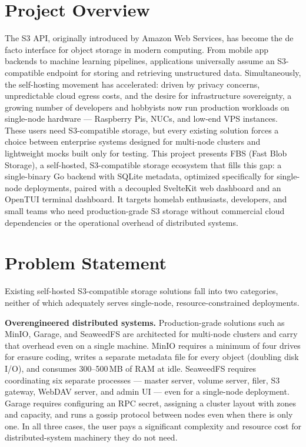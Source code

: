 \documentclass[12pt,a4paper]{report}
\begin{document}
\newpage
\thispagestyle{empty}
\tableofcontents

\newpage
{}
\setcounter{page}{1}

\section{Project Overview}
The S3 API, originally introduced by Amazon Web Services, has become the de facto interface for object storage in modern computing. From mobile app backends to machine learning pipelines, applications universally assume an S3-compatible endpoint for storing and retrieving unstructured data. Simultaneously, the self-hosting movement has accelerated: driven by privacy concerns, unpredictable cloud egress costs, and the desire for infrastructure sovereignty, a growing number of developers and hobbyists now run production workloads on single-node hardware --- Raspberry Pis, NUCs, and low-end VPS instances. These users need S3-compatible storage, but every existing solution forces a choice between enterprise systems designed for multi-node clusters and lightweight mocks built only for testing. This project presents FBS (Fast Blob Storage), a self-hosted, S3-compatible storage ecosystem that fills this gap: a single-binary Go backend with SQLite metadata, optimized specifically for single-node deployments, paired with a decoupled SvelteKit web dashboard and an OpenTUI terminal dashboard. It targets homelab enthusiasts, developers, and small teams who need production-grade S3 storage without commercial cloud dependencies or the operational overhead of distributed systems.

\section{Problem Statement}
Existing self-hosted S3-compatible storage solutions fall into two categories, neither of which adequately serves single-node, resource-constrained deployments.

\textbf{Overengineered distributed systems.} Production-grade solutions such as MinIO, Garage, and SeaweedFS are architected for multi-node clusters and carry that overhead even on a single machine. MinIO requires a minimum of four drives for erasure coding, writes a separate metadata file for every object (doubling disk I/O), and consumes 300--500\,MB of RAM at idle. SeaweedFS requires coordinating six separate processes --- master server, volume server, filer, S3 gateway, WebDAV server, and admin UI --- even for a single-node deployment. Garage requires configuring an RPC secret, assigning a cluster layout with zones and capacity, and runs a gossip protocol between nodes even when there is only one. In all three cases, the user pays a significant complexity and resource cost for distributed-system machinery they do not need.
\end{document}
